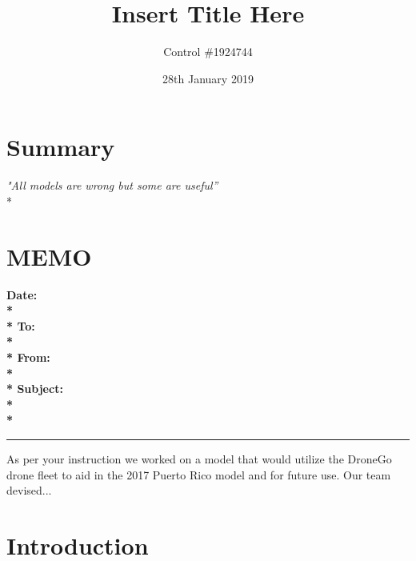 \documentclass[a4paper,12pt]{article}
\begin{document}
\title{Insert Title Here}
\author{Control \#1924744}
\date{28th January 2019}
\maketitle
\newpage


\section*{\hfil Summary\hfil}
\begin{center}
\textit{"All models are wrong but some are useful''} \\*
\end{center}

\newpage

\section*{\hfil MEMO\hfil}
\hrulefill

\bf{Date:} \\*\\*
\bf{To:} \\*\\*
\bf{From:} \\*\\*
\bf{Subject:} \\*\\*
{\color{black}\hrule}
As per your instruction we worked on a model that would utilize the DroneGo drone fleet to aid in the 2017 Puerto Rico model and for future use.
Our team devised...

\newpage


\tableofcontents
\newpage
{}


\newpage


\section{Introduction}
\end{document}
